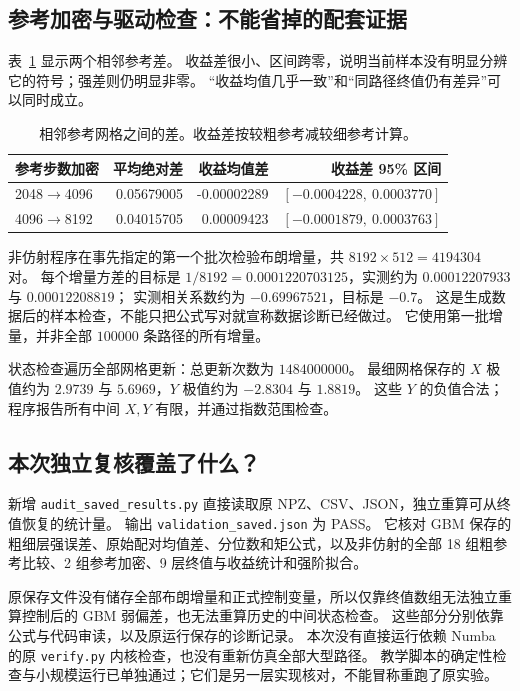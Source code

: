 \documentclass[11pt,a4paper,fontset=none]{ctexart}
\numberwithin{equation}{section}
\begin{document}
\subsection{参考加密与驱动检查：不能省掉的配套证据}
表~\ref{tab:results-reference} 显示两个相邻参考差。
收益差很小、区间跨零，说明当前样本没有明显分辨它的符号；强差则仍明显非零。
“收益均值几乎一致”和“同路径终值仍有差异”可以同时成立。
\begin{table}[htbp]\centering\small
\caption{相邻参考网格之间的差。收益差按较粗参考减较细参考计算。}\label{tab:results-reference}
\begin{tabular}{lrrr}\toprule
参考步数加密 & 平均绝对差 & 收益均值差 & 收益差 95\% 区间\\\midrule
2048$\to$4096 & 0.05679005 & -0.00002289 & $[-0.0004228,\ 0.0003770]$\\
4096$\to$8192 & 0.04015705 & 0.00009423 & $[-0.0001879,\ 0.0003763]$\\
\bottomrule
\end{tabular}
\end{table}


非仿射程序在事先指定的第一个批次检验布朗增量，共 $8192\times512=4194304$ 对。
每个增量方差的目标是 $1/8192=0.0001220703125$，实测约为 $0.00012207933$ 与 $0.00012208819$；
实测相关系数约为 $-0.69967521$，目标是 $-0.7$。
这是生成数据后的样本检查，不能只把公式写对就宣称数据诊断已经做过。
它使用第一批增量，并非全部 $100000$ 条路径的所有增量。

状态检查遍历全部网格更新：总更新次数为 $1484000000$。
最细网格保存的 $X$ 极值约为 $2.9739$ 与 $5.6969$，$Y$ 极值约为 $-2.8304$ 与 $1.8819$。
这些 $Y$ 的负值合法；程序报告所有中间 $X,Y$ 有限，并通过指数范围检查。

\subsection{本次独立复核覆盖了什么？}
新增 \texttt{audit\_saved\_results.py} 直接读取原 NPZ、CSV、JSON，独立重算可从终值恢复的统计量。
输出 \texttt{validation\_saved.json} 为 PASS。
它核对 GBM 保存的粗细层强误差、原始配对均值差、分位数和矩公式，以及非仿射的全部 18 组粗参考比较、2 组参考加密、9 层终值与收益统计和强阶拟合。

原保存文件没有储存全部布朗增量和正式控制变量，所以仅靠终值数组无法独立重算控制后的 GBM 弱偏差，也无法重算历史的中间状态检查。
这些部分分别依靠公式与代码审读，以及原运行保存的诊断记录。
本次没有直接运行依赖 Numba 的原 \texttt{verify.py} 内核检查，也没有重新仿真全部大型路径。
教学脚本的确定性检查与小规模运行已单独通过；它们是另一层实现核对，不能冒称重跑了原实验。
\end{document}
